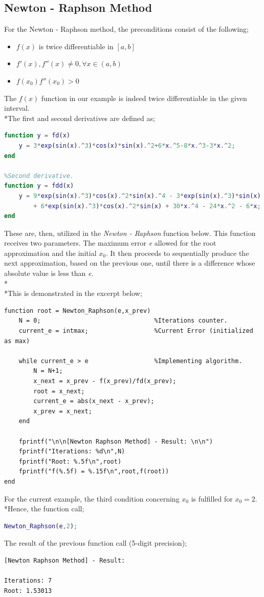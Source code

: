 \documentclass{article}
\begin{document}
\subsection{Newton - Raphson Method}
For the Newton - Raphson method, the preconditions consist of the following;
\begin{itemize}
    \item $f(x)$ is twice differentiable in $[a,b]$
    \item $f'(x),f''(x) \neq 0, \forall x \in (a,b)$
    \item $f(x_0)f''(x_0) > 0$
\end{itemize}
The $f(x)$ function in our example is indeed twice differentiable in the given interval.\\*The first and second derivatives are defined as;
\begin{lstlisting}[language=Matlab]
%First derivative.
function y = fd(x)
    y = 3*exp(sin(x).^3)*cos(x)*sin(x).^2+6*x.^5-8*x.^3-3*x.^2;
end

%Second derivative.
function y = fdd(x)
    y = 9*exp(sin(x).^3)*cos(x).^2*sin(x).^4 - 3*exp(sin(x).^3)*sin(x).^3 
        + 6*exp(sin(x).^3)*cos(x).^2*sin(x) + 30*x.^4 - 24*x.^2 - 6*x;
end 
\end{lstlisting}
These are, then, utilized in the \emph{Newton - Raphson} function below. This function receives two parameters. The maximum error \emph{e} allowed for the root approximation and the initial $x_0$. It then proceeds to sequentially produce the next approximation, based on the previous one, until there is a difference whose absolute value is less than \emph{e}.\\*\\*This is demonstrated in the excerpt below;
\begin{lstlisting}
function root = Newton_Raphson(e,x_prev)
    N = 0;                               %Iterations counter.
    current_e = intmax;                  %Current Error (initialized as max)

    while current_e > e                  %Implementing algorithm.
        N = N+1;                                  
        x_next = x_prev - f(x_prev)/fd(x_prev);   
        root = x_next;                            
        current_e = abs(x_next - x_prev);         
        x_prev = x_next;                          
    end    

    fprintf("\n\n[Newton Raphson Method] - Result: \n\n")   
    fprintf("Iterations: %d\n",N)                
    fprintf("Root: %.5f\n",root)         
    fprintf("f(%.5f) = %.15f\n",root,f(root)) 
end
\end{lstlisting}
For the current example, the third condition concerning $x_0$ is fulfilled for $x_0=2$.\\*Hence, the function call;
\begin{lstlisting}[language=Matlab]
Newton_Raphson(e,2);
\end{lstlisting}
The result of the previous function call (5-digit precision);
\begin{lstlisting}
[Newton Raphson Method] - Result: 

Iterations: 7
Root: 1.53013
\end{lstlisting}
\pagebreak
\end{document}
